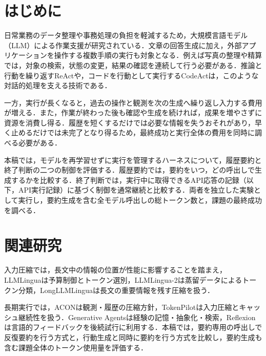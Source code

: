 \documentclass[letter]{ieicej}
\begin{document}
\maketitle



\section{はじめに}

日常業務のデータ整理や事務処理の負担を軽減するため，大規模言語モデル（LLM）による作業支援が研究されている．文章の回答生成に加え，外部アプリケーションを操作する複数手順の実行も対象となる．例えば写真の整理や精算では，対象の検索，状態の変更，結果の確認を連続して行う必要がある．推論と行動を繰り返すReAct\cite{yao2023react}や，コードを行動として実行するCodeAct\cite{wang2024codeact}は，このような対話的処理を支える技術である．

一方，実行が長くなると，過去の操作と観測を次の生成へ繰り返し入力する費用が増える．また，作業が終わった後も確認や生成を続ければ，成果を増やさずに資源を消費し得る．履歴を短くするだけでは必要な情報を失うおそれがあり，早く止めるだけでは未完了となり得るため，最終成功と実行全体の費用を同時に調べる必要がある．

本稿では，モデルを再学習せずに実行を管理するハーネスについて，履歴要約と終了判断の二つの制御を評価する．履歴要約では，要約をいつ，どの呼出しで生成するかを比較する．終了判断では，実行中に取得できるAPI応答の記録（以下，API実行記録）に基づく制御を通常継続と比較する．両者を独立した実験として実行し，要約生成を含む全モデル呼出しの総トークン数と，課題の最終成功を調べる．

\section{関連研究}

入力圧縮では，長文中の情報の位置が性能に影響すること\cite{liu2024lost}を踏まえ，LLMLingua\cite{jiang2023llmlingua}は予算制御とトークン選別，LLMLingua-2\cite{pan2024llmlingua2}は蒸留データによるトークン分類，LongLLMLingua\cite{jiang2024longllmlingua}は長文の重要情報を残す圧縮を扱う．

長期実行では，ACON\cite{kang2026acon}は観測・履歴の圧縮方針，TokenPilot\cite{xu2026tokenpilot}は入力圧縮とキャッシュ継続性を扱う．Generative Agents\cite{park2023generative}は経験の記憶・抽象化・検索，Reflexion\cite{shinn2023reflexion}は言語的フィードバックを後続試行に利用する．本稿では，要約専用の呼出しで反復要約を行う方式と，行動生成と同時に要約を行う方式を比較し，要約生成も含む課題全体のトークン使用量を評価する．
\end{document}

